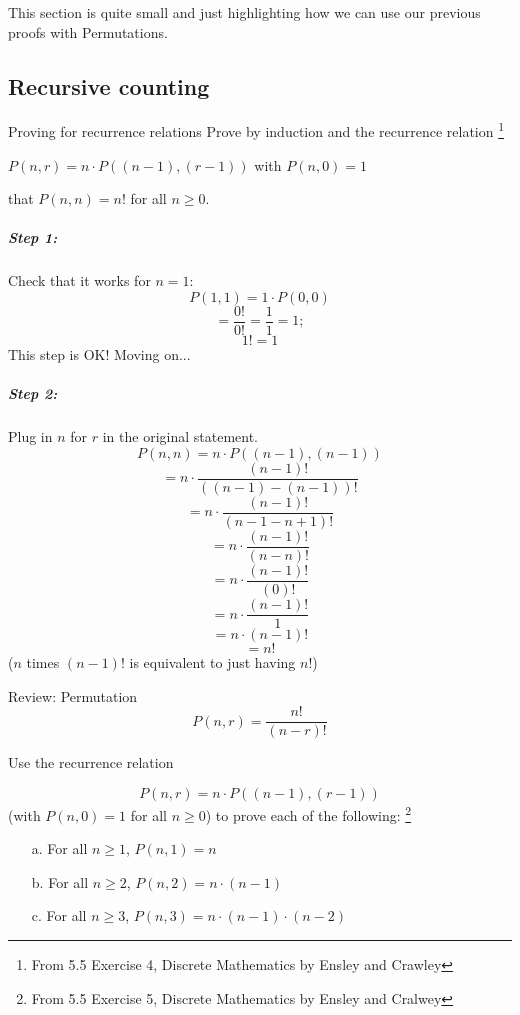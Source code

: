     This section is quite small and just highlighting how we can use
    our previous proofs with Permutations.

    \newpage
    
    \subsection{Recursive counting}

    \begin{intro}{Proving for recurrence relations}
        Prove by induction and the recurrence relation
        \footnote{From 5.5 Exercise 4, Discrete Mathematics by Ensley and Crawley}
        
        $P(n,r) = n \cdot P((n-1), (r-1))$ with $P(n,0)=1$
            
        \begin{center}
            that $P(n,n) = n!$ for all $n \geq 0$.
        \end{center}
        
        
        \subparagraph{Step 1:} Check that it works for $n=1$: \\
            $$P(1,1) = 1 \cdot P(0, 0)$$
            $$ = \frac{0!}{0!} = \frac{1}{1} = 1;$$
            $$ 1! = 1 $$
            This step is OK! Moving on...

        \subparagraph{Step 2:}  Plug in $n$ for $r$ in the original statement. 
            $$P(n,n) = n \cdot P( (n-1), (n-1) )$$
            $$= n \cdot \frac{(n-1)!}{( (n-1) - (n-1) )!}$$
            $$= n \cdot \frac{(n-1)!}{( n - 1 - n + 1 )!}$$
            $$= n \cdot \frac{(n-1)!}{( n - n )!}$$
            $$= n \cdot \frac{(n-1)!}{( 0 )!}$$
            $$= n \cdot \frac{(n-1)!}{1}$$
            $$= n \cdot (n-1)!$$
            $$= n!$$
            ($n$ times $(n-1)!$ is equivalent to just having $n!$)
            
    \end{intro}

    \begin{intro}{Review: Permutation}
        $$P(n,r) = \frac{n!}{(n-r)!}$$
    \end{intro}
    
    \begin{questionNOGRADE}{\thequestion}
        Use the recurrence relation

        $$P(n,r) = n \cdot P((n-1), (r-1))$$
        (with $P(n,0) = 1$ for all $n \geq 0$)
        to prove each of the following:
        \footnote{From 5.5 Exercise 5, Discrete Mathematics by Ensley and Cralwey}

        \begin{itemize}
            \item[a.]   For all $n \geq 1$, $P(n,1) = n$

            \item[b.]   For all $n \geq 2$, $P(n,2) = n \cdot (n-1)$

            \item[c.]   For all $n \geq 3$, $P(n,3) = n \cdot (n-1) \cdot (n-2)$
        \end{itemize}
    \end{questionNOGRADE}




